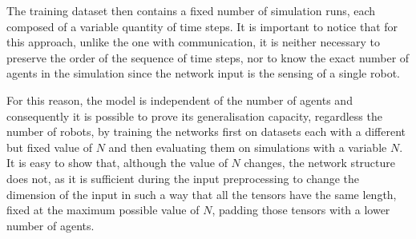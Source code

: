 The training dataset then contains a fixed number of simulation runs, each 
composed of a variable quantity of time steps. It is important to notice that 
for this approach, unlike the one with communication, it is neither necessary to 
preserve the order of the sequence of time steps, nor to know the exact number 
of agents in the simulation since the network input is the sensing of a single robot.

For this reason, the model is independent of the number of agents and 
consequently it is possible to prove its generalisation capacity, regardless the 
number of robots, by training the networks first on datasets each with a different 
but fixed value of $N$ and then evaluating them on simulations with a variable 
$N$.
It is easy to show that, although the value of $N$ changes, the network structure 
does not, as it is sufficient during the input preprocessing to change the 
dimension of the input in such a way that all the tensors have the same length, 
fixed at the maximum possible value of $N$, padding those tensors with a lower 
number of agents.

